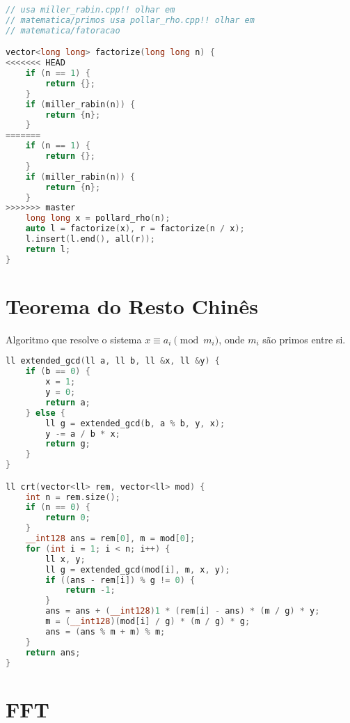 \documentclass[11pt, a4paper, oneside]{book}
\begin{document}
\hfill

\begin{multicols}{2}
\begin{lstlisting}[language=C++]
// usa miller_rabin.cpp!! olhar em
// matematica/primos usa pollar_rho.cpp!! olhar em
// matematica/fatoracao

vector<long long> factorize(long long n) {
<<<<<<< HEAD
    if (n == 1) {
        return {};
    }
    if (miller_rabin(n)) {
        return {n};
    }
=======
    if (n == 1) {
        return {};
    }
    if (miller_rabin(n)) {
        return {n};
    }
>>>>>>> master
    long long x = pollard_rho(n);
    auto l = factorize(x), r = factorize(n / x);
    l.insert(l.end(), all(r));
    return l;
}
\end{lstlisting}
\end{multicols}

\hfill

\section{Teorema do Resto Chinês}


Algoritmo que resolve o sistema $x \equiv a_i \pmod{m_i}$, onde $m_i$ são primos entre si.



\textbf{} 
\hfill

\begin{multicols}{2}
\begin{lstlisting}[language=C++]
ll extended_gcd(ll a, ll b, ll &x, ll &y) {
    if (b == 0) {
        x = 1;
        y = 0;
        return a;
    } else {
        ll g = extended_gcd(b, a % b, y, x);
        y -= a / b * x;
        return g;
    }
}

ll crt(vector<ll> rem, vector<ll> mod) {
    int n = rem.size();
    if (n == 0) {
        return 0;
    }
    __int128 ans = rem[0], m = mod[0];
    for (int i = 1; i < n; i++) {
        ll x, y;
        ll g = extended_gcd(mod[i], m, x, y);
        if ((ans - rem[i]) % g != 0) {
            return -1;
        }
        ans = ans + (__int128)1 * (rem[i] - ans) * (m / g) * y;
        m = (__int128)(mod[i] / g) * (m / g) * g;
        ans = (ans % m + m) % m;
    }
    return ans;
}
\end{lstlisting}
\end{multicols}

\hfill

\section{FFT}
\end{document}
